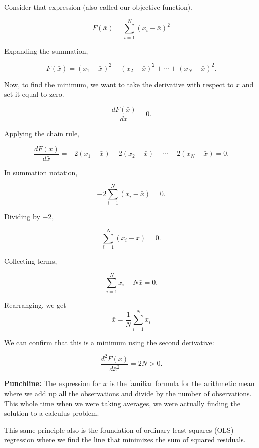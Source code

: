 \documentclass[12pt]{article}
\begin{document}
Consider that expression (also called our objective function). 

\[
F(\bar{x})=\sum_{i=1}^{N}(x_i-\bar{x})^2
\]

Expanding the summation,

\[
F(\bar{x})
=(x_1-\bar{x})^2+(x_2-\bar{x})^2 +\cdots+(x_N-\bar{x})^2.
\]


Now, to find the minimum, we want to take the derivative with respect to $\bar{x}$ and set it equal to zero.

\[
\frac{dF(\bar{x})}{d\bar{x}}=0.
\]

Applying the chain rule,

\[
\frac{dF(\bar{x})}{d\bar{x}} =-2(x_1-\bar{x})-2(x_2-\bar{x})-\cdots-2(x_N-\bar{x})=0.
\]

In summation notation,

\[
-2\sum_{i=1}^{N}(x_i-\bar{x})=0.
\]

Dividing by $-2$,

\[
\sum_{i=1}^{N}(x_i-\bar{x})=0.
\]

Collecting terms,

\[
\sum_{i=1}^{N}x_i-N\bar{x}=0.
\]

Rearranging, we get
\[
\bar{x}=\frac{1}{N}\sum_{i=1}^{N}x_i
\]

We can confirm that this is a minimum
using the second derivative:

\[
\frac{d^2F(\bar{x})}{d\bar{x}^2}=2N>0.
\]


\textbf{Punchline:} The expression for $\bar{x}$ is the familiar formula for the arithmetic mean where we add up all
the observations and divide by the number of observations. This whole time when we were taking averages, we were actually finding the solution to a calculus problem.

This same principle also is the foundation of ordinary least squares (OLS) regression where we find the line that minimizes the sum of squared residuals.
\end{document}
